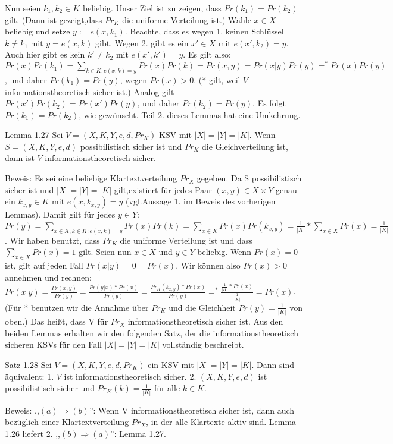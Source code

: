 \documentclass[a4paper]{article}
\begin{document}
\begin{multicols}{3}
Nun seien $k_1,k_2\in K$ beliebig. Unser Ziel ist zu zeigen, dass $Pr(k_1)=Pr(k_2)$ gilt. (Dann ist gezeigt,dass $Pr_K$ die uniforme Verteilung ist.) Wähle $x\in X$ beliebig und setze $y:=e(x,k_1)$. Beachte, dass es wegen 1. keinen Schlüssel $k\not=k_1$ mit $y=e(x,k)$ gibt. Wegen 2. gibt es ein $x′\in X$ mit $e(x′,k_2)=y$. Auch hier gibt es kein $k′\not=k_2$ mit $e(x′,k′)=y$. Es gilt also: $Pr(x)Pr(k_1)=\sum_{k\in K:e(x,k)=y} Pr(x)Pr(k) = Pr(x,y) = Pr(x|y)Pr(y) =^* Pr(x)Pr(y)$, und daher $Pr(k_1)=Pr(y)$, wegen $Pr(x)>0$. (* gilt, weil $V$ informationstheoretisch sicher ist.) Analog gilt $Pr(x′)Pr(k_2)=Pr(x′)Pr(y)$, und daher $Pr(k_2)=Pr(y)$. Es folgt $Pr(k_1)=Pr(k_2)$, wie gewünscht.
Teil 2. dieses Lemmas hat eine Umkehrung.

Lemma 1.27 Sei $V=(X,K,Y,e,d,Pr_K)$ KSV mit $|X|=|Y|=|K|$. Wenn $S=(X,K,Y,e,d)$ possibilistisch sicher ist und $Pr_K$ die Gleichverteilung ist, dann ist $V$ informationstheoretisch sicher.

Beweis: Es sei eine beliebige Klartextverteilung $Pr_X$ gegeben. Da S possibilistisch sicher ist und $|X|=|Y|=|K|$ gilt,existiert für jedes Paar $(x,y)\in X\times Y$ genau ein $k_{x,y}\in K$ mit $e(x,k_{x,y}) =y$ (vgl.Aussage 1. im Beweis des vorherigen Lemmas).
Damit gilt für jedes $y\in Y$:$Pr(y)=\sum_{x\in X,k\in K:e(x,k)=y} Pr(x)Pr(k) =\sum_{x\in X} Pr(x) Pr(k_{x,y})=\frac{1}{|K|}* \sum_{x\in X} Pr(x) = \frac{1}{|K|}$.
Wir haben benutzt, dass $Pr_K$ die uniforme Verteilung ist und dass $\sum_{x\in X} Pr(x) = 1$ gilt.
Seien nun $x\in X$ und $y\in Y$ beliebig. Wenn $Pr(x)=0$ ist, gilt auf jeden Fall $Pr(x|y)=0=Pr(x)$. Wir können also $Pr(x)> 0$ annehmen und rechnen: $Pr(x|y) =\frac{Pr(x,y)}{Pr(y)}=\frac{Pr(y|x)*Pr(x)}{Pr(y)}=\frac{Pr_K(k_{x,y})*Pr(x)}{Pr(y)}=^* \frac{\frac{1}{|K|}*Pr(x)}{\frac{1}{|K|}}=Pr(x)$.
(Für * benutzen wir die Annahme über $Pr_K$ und die Gleichheit $Pr(y)=\frac{1}{|K|}$ von oben.) Das heißt, dass V  für $Pr_X$ informationstheoretisch sicher ist.
Aus den beiden Lemmas erhalten wir den folgenden Satz, der die informationstheoretisch sicheren KSVs für den Fall $|X|=|Y|=|K|$ vollständig beschreibt.

Satz 1.28 Sei $V= (X,K,Y,e,d,Pr_K)$ ein KSV mit $|X|=|Y|=|K|$. Dann sind äquivalent:
1. $V$ ist informationstheoretisch sicher.
2. $(X,K,Y,e,d)$ ist possibilistisch sicher und $Pr_K(k)=\frac{1}{|K|}$ für alle $k\in K$.

Beweis:  ,,$(a)\Rightarrow (b)$'': Wenn V informationstheoretisch sicher ist, dann auch bezüglich einer Klartextverteilung $Pr_X$, in der alle Klartexte aktiv sind. Lemma 1.26 liefert 2. ,,$(b)\Rightarrow (a)$'': Lemma 1.27.


\end{multicols}
\end{document}
